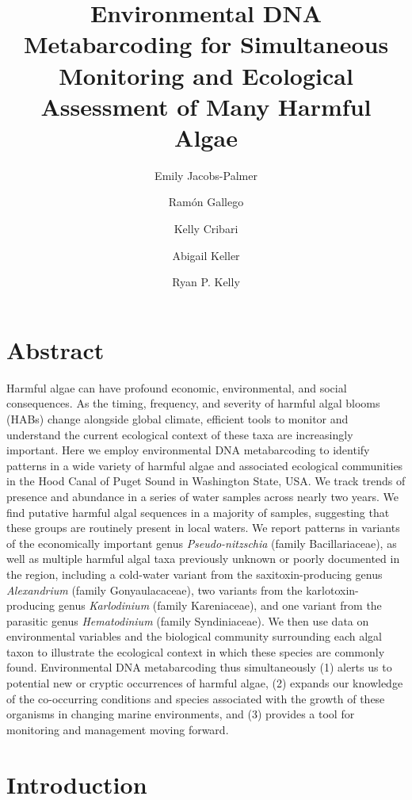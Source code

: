 \documentclass[
]{article}
\title{Environmental DNA Metabarcoding for Simultaneous Monitoring and
Ecological Assessment of Many Harmful Algae}
\author{Emily Jacobs-Palmer \and Ramón Gallego \and Kelly Cribari \and Abigail Keller \and Ryan P. Kelly}
\date{}
\begin{document}
\maketitle

\hypertarget{abstract}{%
\section{Abstract}\label{abstract}}

Harmful algae can have profound economic, environmental, and social
consequences. As the timing, frequency, and severity of harmful algal
blooms (HABs) change alongside global climate, efficient tools to
monitor and understand the current ecological context of these taxa are
increasingly important. Here we employ environmental DNA metabarcoding
to identify patterns in a wide variety of harmful algae and associated
ecological communities in the Hood Canal of Puget Sound in Washington
State, USA. We track trends of presence and abundance in a series of
water samples across nearly two years. We find putative harmful algal
sequences in a majority of samples, suggesting that these groups are
routinely present in local waters. We report patterns in variants of the
economically important genus \emph{Pseudo-nitzschia} (family
Bacillariaceae), as well as multiple harmful algal taxa previously
unknown or poorly documented in the region, including a cold-water
variant from the saxitoxin-producing genus \emph{Alexandrium} (family
Gonyaulacaceae), two variants from the karlotoxin-producing genus
\emph{Karlodinium} (family Kareniaceae), and one variant from the
parasitic genus \emph{Hematodinium} (family Syndiniaceae). We then use
data on environmental variables and the biological community surrounding
each algal taxon to illustrate the ecological context in which these
species are commonly found. Environmental DNA metabarcoding thus
simultaneously (1) alerts us to potential new or cryptic occurrences of
harmful algae, (2) expands our knowledge of the co-occurring conditions
and species associated with the growth of these organisms in changing
marine environments, and (3) provides a tool for monitoring and
management moving forward.

\hypertarget{introduction}{%
\section{Introduction}\label{introduction}}
\end{document}
